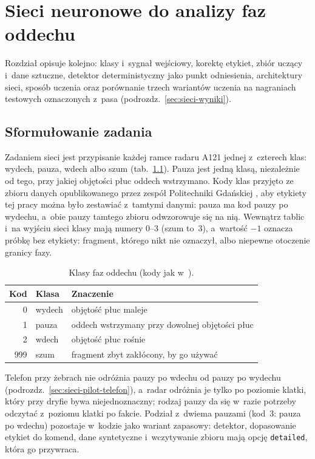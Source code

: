 \documentclass[12pt,a4paper,oneside]{report}
\begin{document}
\chapter{Sieci neuronowe do analizy faz oddechu}
\label{chap:sieci}

Rozdział opisuje kolejno: klasy i~sygnał wejściowy, korektę etykiet, zbiór uczący
i~dane sztuczne, detektor deterministyczny jako punkt odniesienia, architektury
sieci, sposób uczenia oraz porównanie trzech wariantów uczenia na nagraniach
testowych oznaczonych z~pasa (podrozdz.~\ref{sec:sieci-wyniki}).

\section{Sformułowanie zadania}
\label{sec:sieci-zadanie}

Zadaniem sieci jest przypisanie każdej ramce radaru A121 jednej z~czterech
klas: wydech, pauza, wdech albo szum (tab.~\ref{tab:klasy-faz}). Pauza jest jedną
klasą, niezależnie od tego, przy jakiej objętości płuc oddech wstrzymano. Kody
klas przyjęto ze zbioru danych opublikowanego przez zespół Politechniki Gdańskiej
\cite{szymanski2025}, aby etykiety tej pracy można było zestawiać z~tamtymi
danymi: pauza ma kod pauzy po wydechu, a~obie pauzy tamtego zbioru odwzorowuje się
na nią. Wewnątrz tablic i~na wyjściu sieci klasy mają numery 0--3 (szum to~3), a~wartość $-1$ oznacza próbkę bez etykiety:
fragment, którego nikt nie oznaczył, albo niepewne otoczenie granicy fazy.

\begin{table}[H]
\centering
\caption{Klasy faz oddechu (kody jak w~\cite{szymanski2025}).}
\label{tab:klasy-faz}
\begin{tabular}{@{}rll@{}}
\toprule
Kod & Klasa & Znaczenie \\
\midrule
0 & wydech & objętość płuc maleje \\
1 & pauza & oddech wstrzymany przy dowolnej objętości płuc \\
2 & wdech & objętość płuc rośnie \\
999 & szum & fragment zbyt zakłócony, by go używać \\
\bottomrule
\end{tabular}
\end{table}

Telefon przy żebrach nie odróżnia pauzy po wdechu od pauzy po wydechu
(podrozdz.~\ref{sec:sieci-pilot-telefon}), a~radar odróżnia je tylko po poziomie
klatki, który przy dryfie bywa niejednoznaczny; rodzaj pauzy da się w~razie potrzeby
odczytać z~poziomu klatki po fakcie. Podział z~dwiema pauzami (kod~3: pauza po
wdechu) pozostaje w~kodzie jako wariant zapasowy: detektor, dopasowanie etykiet do
komend, dane syntetyczne i~wczytywanie zbioru \cite{szymanski2025} mają opcję
\texttt{detailed}, która go przywraca.
\end{document}
